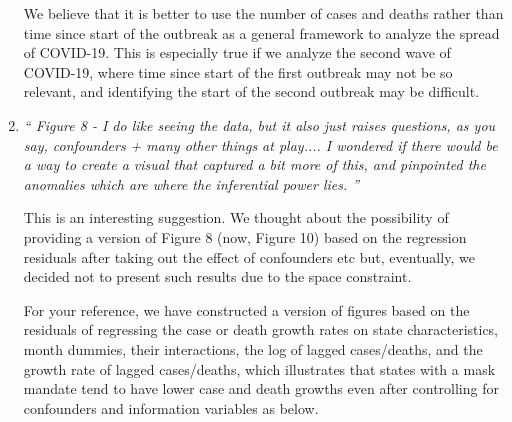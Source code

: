 \documentclass[11pt]{article}
\begin{document}
\begin{enumerate}
We believe that it is better to use the number of cases and deaths rather than time since start of the outbreak as a  general framework to analyze the spread of COVID-19. This is especially true if we analyze the second wave of COVID-19, where time since start of the first outbreak may not be so relevant, and identifying the start of the second outbreak may be difficult. 



\item \textit{`` Figure 8 - I do like seeing the data, but it also just raises questions, as you say, confounders + many other things at play.... I wondered if there would be a way to create a visual that captured a bit more of this, and pinpointed the anomalies which are where the inferential power lies. ''}

This is an interesting suggestion. We thought about the possibility of providing a version of Figure 8 (now, Figure 10) based on the regression residuals after taking out the effect of confounders etc but, eventually, we decided not to present such results due to the space constraint.  


For your reference, we have constructed a version of  figures based on the residuals of regressing the case or death growth rates on state characteristics, month dummies,   their interactions,  the log of lagged cases/deaths, and the growth rate of lagged cases/deaths, which illustrates that states with a mask mandate tend to have lower case and death growths even after controlling for confounders and information variables as below.   %


\end{enumerate}
\end{document}
